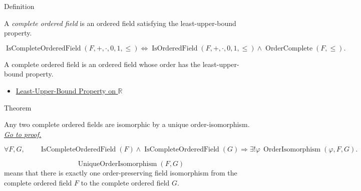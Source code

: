 \begin{definitionbox}{Definition}
\begin{definition}
\label{def:real-ordered-field}
A \emph{complete ordered field} is an ordered field satisfying the
least-upper-bound property.
\end{definition}
\end{definitionbox}

\begin{remark*}
\[
\operatorname{IsCompleteOrderedField}(F,+,\cdot,0,1,\le)
\Longleftrightarrow
\operatorname{IsOrderedField}(F,+,\cdot,0,1,\le)
\land
\operatorname{OrderComplete}(F,\le).
\]
\end{remark*}

\begin{remark*}[Interpretation]
A complete ordered field is an ordered field whose order has the least-upper-bound property.
\end{remark*}

\begin{dependencies}
\begin{itemize}
\item \hyperref[def:least-upper-bound-property-on-r]{Least-Upper-Bound Property on $\mathbb{R}$}
\end{itemize}
\end{dependencies}

\begin{theorembox}{Theorem}
\begin{theorem}
\label{thm:uniqueness-of-cof}
Any two complete ordered fields are isomorphic by a unique order-isomorphism.
\hyperref[prf:uniqueness-of-cof]{\textit{Go to proof.}}
\end{theorem}
\end{theorembox}

\begin{remark*}
\[
\forall F,G,\qquad
\operatorname{IsCompleteOrderedField}(F)\land\operatorname{IsCompleteOrderedField}(G)
\Longrightarrow
\exists!\varphi\,\operatorname{OrderIsomorphism}(\varphi,F,G).
\]
\end{remark*}

\begin{remark*}
\[
\operatorname{UniqueOrderIsomorphism}(F,G)
\]
means that there is exactly one order-preserving field isomorphism from the complete ordered field $F$ to the complete ordered field $G$.
\end{remark*}

